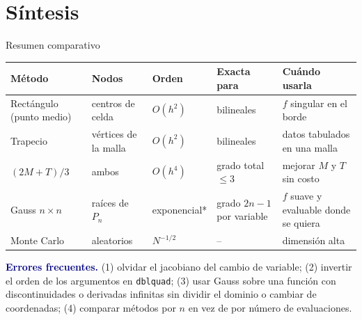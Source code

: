 \documentclass[aspectratio=169,10pt]{beamer}
\begin{document}
\section{S\'intesis}
\begin{frame}{Resumen comparativo}
\centering\footnotesize
\begin{tabular}{@{}L{2.7cm}L{2.4cm}L{1.6cm}L{2.6cm}L{3.3cm}@{}}
\toprule
M\'etodo & Nodos & Orden & Exacta para & Cu\'ando usarla\\
\midrule
Rect\'angulo (punto medio) & centros de celda & $O(h^2)$ & bilineales & $f$ singular en el borde\\
Trapecio & v\'ertices de la malla & $O(h^2)$ & bilineales & datos tabulados en una malla\\
$(2M+T)/3$ & ambos & $O(h^4)$ & grado total $\le3$ & mejorar $M$ y $T$ sin costo\\
Gauss $n\times n$ & ra\'ices de $P_n$ & exponencial* & grado $2n-1$ por variable & $f$ suave y evaluable donde se quiera\\
Monte Carlo & aleatorios & $N^{-1/2}$ & -- & dimensi\'on alta\\
\bottomrule
\end{tabular}
\par{}
\begin{clave}\small
\textbf{\textcolor{navy}{Errores frecuentes.}} (1) olvidar el jacobiano del cambio de variable; (2) invertir el orden de los argumentos en \texttt{dblquad}; (3) usar Gauss sobre una funci\'on con discontinuidades o derivadas infinitas sin dividir el dominio o cambiar de coordenadas; (4) comparar m\'etodos por $n$ en vez de por \alert{n\'umero de evaluaciones}.
\end{clave}
\end{frame}
\end{document}
